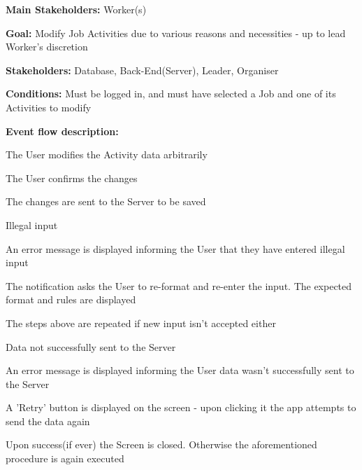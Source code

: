 			\noindent {}
			\begin{packed_item}
				\item \textbf{Main Stakeholders:} Worker(s)
				\item \textbf{Goal:} Modify Job Activities due to various reasons and necessities - up to lead Worker's discretion
				\item \textbf{Stakeholders: } Database, Back-End(Server), Leader, Organiser
				\item \textbf{Conditions: } Must be logged in, and must have selected a Job and one of its Activities to modify
				\item \textbf{Event flow description: }
				\begin{packed_enum}
					\item The User modifies the Activity data arbitrarily
					\item The User confirms the changes
					\item The changes are sent to the Server to be saved
				\end{packed_enum}
				
				\begin{packed_item}
					\item[1.a] Illegal input
					\item[] \begin{packed_enum}
						\item An error message is displayed informing the User that they have entered illegal input
						\item The notification asks the User to re-format and re-enter the input. The expected format and rules are displayed
						\item The steps above are repeated if new input isn't accepted either
					\end{packed_enum}
					
					\item[3.a] Data not successfully sent to the Server
					\item[] \begin{packed_enum}
						\item An error message is displayed informing the User data wasn't successfully sent to the Server
						\item A 'Retry' button is displayed on the screen - upon clicking it the app attempts to send the data again
						\item Upon success(if ever) the Screen is closed. Otherwise the aforementioned procedure is again executed
					\end{packed_enum}
				\end{packed_item}
			\end{packed_item}
			
